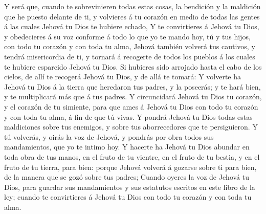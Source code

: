  Y será que, cuando te sobrevinieren todas estas cosas, la
bendición y la maldición que he puesto delante de ti, y volvieres á tu
corazón en medio de todas las gentes á las cuales Jehová tu Dios te
hubiere echado,  Y te convirtieres á Jehová tu Dios, y
obedecieres á su voz conforme á todo lo que yo te mando hoy, tú y tus
hijos, con todo tu corazón y con toda tu alma,  Jehová
también volverá tus cautivos, y tendrá misericordia de ti, y tornará á
recogerte de todos los pueblos á los cuales te hubiere esparcido Jehová
tu Dios.  Si hubieres sido arrojado hasta el cabo de los
cielos, de allí te recogerá Jehová tu Dios, y de allá te tomará:
 Y volverte ha Jehová tu Dios á la tierra que heredaron tus
padres, y la poseerás; y te hará bien, y te multiplicará más que á tus
padres.  Y circuncidará Jehová tu Dios tu corazón, y el
corazón de tu simiente, para que ames á Jehová tu Dios con todo tu
corazón y con toda tu alma, á fin de que tú vivas.  Y pondrá
Jehová tu Dios todas estas maldiciones sobre tus enemigos, y sobre tus
aborrecedores que te persiguieron.  Y tú volverás, y oirás
la voz de Jehová, y pondrás por obra todos sus mandamientos, que yo te
intimo hoy.  Y hacerte ha Jehová tu Dios abundar en toda
obra de tus manos, en el fruto de tu vientre, en el fruto de tu bestia,
y en el fruto de tu tierra, para bien: porque Jehová volverá á gozarse
sobre ti para bien, de la manera que se gozó sobre tus padres;
 Cuando oyeres la voz de Jehová tu Dios, para guardar sus
mandamientos y sus estatutos escritos en este libro de la ley; cuando te
convirtieres á Jehová tu Dios con todo tu corazón y con toda tu alma.

